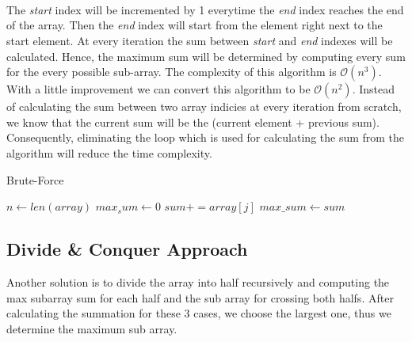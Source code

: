 \documentclass[twocolumns]{IEEEtran}
\begin{document}
\\ \\ \\
The \textit{start} index will be incremented by 1 everytime the \textit{end} index reaches the end of the array. Then the \textit{end} index will start from the element right next to the start element. At every iteration the sum between \textit{start} and \textit{end} indexes will be calculated. Hence, the maximum sum will be determined by computing every sum for the every possible sub-array. The complexity of this algorithm is $\mathcal{O}(n^3)$. With a little improvement we can convert this algorithm to be $\mathcal{O}(n^2)$. Instead of calculating the sum between two array indicies at every iteration from scratch, we know that the current sum will be the (current element + previous sum). Consequently, eliminating the loop which is used for calculating the sum from the algorithm will reduce the time complexity.
\newpage
\begin{algorithm}
	\caption{Brute-Force}
	\begin{algorithmic} 
		\STATE $n \leftarrow len(array)  $ 
		\STATE $max_sum \leftarrow 0$ 
			\STATE $sum += array[j]$
				\STATE $max\_sum \leftarrow sum$ 
			\ENDIF
			\ENDFOR
		\ENDFOR
	\end{algorithmic}
\end{algorithm}
\subsection{Divide \& Conquer Approach}
Another solution is to divide the array into half recursively and computing the max subarray sum for each half and the sub array for crossing both halfs. After calculating the summation for these 3 cases, we choose the largest one, thus we determine the maximum sub array.\\ 
\end{document}
